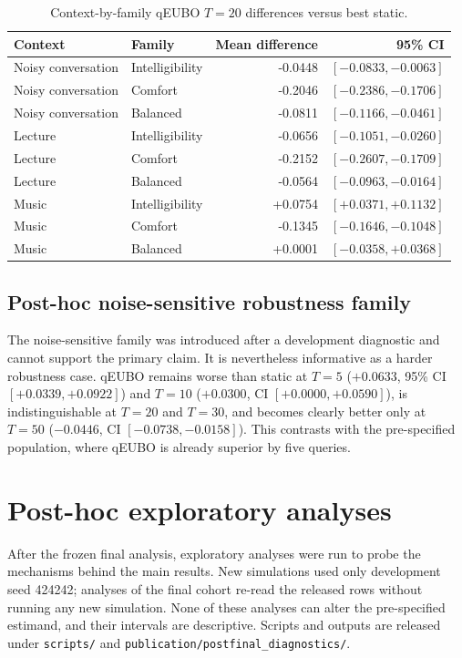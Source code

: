 \documentclass[preprint,12pt]{elsarticle}
\begin{document}
\begin{table}[!htbp]
\centering
\caption{Context-by-family qEUBO $T=20$ differences versus best static.}
\label{tab:cells}
\begin{tabular}{llrr}
\toprule
Context & Family & Mean difference & 95\% CI \\
\midrule
Noisy conversation & Intelligibility & -0.0448 & $[-0.0833,-0.0063]$ \\
Noisy conversation & Comfort & -0.2046 & $[-0.2386,-0.1706]$ \\
Noisy conversation & Balanced & -0.0811 & $[-0.1166,-0.0461]$ \\
Lecture & Intelligibility & -0.0656 & $[-0.1051,-0.0260]$ \\
Lecture & Comfort & -0.2152 & $[-0.2607,-0.1709]$ \\
Lecture & Balanced & -0.0564 & $[-0.0963,-0.0164]$ \\
Music & Intelligibility & +0.0754 & $[+0.0371,+0.1132]$ \\
Music & Comfort & -0.1345 & $[-0.1646,-0.1048]$ \\
Music & Balanced & +0.0001 & $[-0.0358,+0.0368]$ \\
\bottomrule
\end{tabular}
\end{table}

\subsection{Post-hoc noise-sensitive robustness family}

The noise-sensitive family was introduced after a development diagnostic and cannot support the primary claim. It is nevertheless informative as a harder robustness case. qEUBO remains worse than static at $T=5$ ($+0.0633$, 95\% CI $[+0.0339,+0.0922]$) and $T=10$ ($+0.0300$, CI $[+0.0000,+0.0590]$), is indistinguishable at $T=20$ and $T=30$, and becomes clearly better only at $T=50$ ($-0.0446$, CI $[-0.0738,-0.0158]$). This contrasts with the pre-specified population, where qEUBO is already superior by five queries.

\section{Post-hoc exploratory analyses}
\label{sec:exploratory}

After the frozen final analysis, exploratory analyses were run to probe the mechanisms behind the main results. New simulations used only development seed 424242; analyses of the final cohort re-read the released rows without running any new simulation. None of these analyses can alter the pre-specified estimand, and their intervals are descriptive. Scripts and outputs are released under \texttt{scripts/} and \texttt{publication/postfinal\_diagnostics/}.
\end{document}
